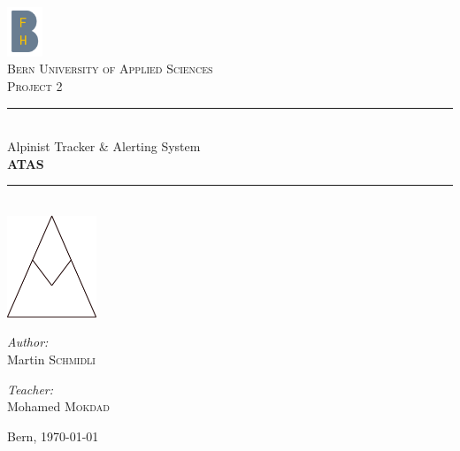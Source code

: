 \documentclass[a4paper,11pt, oneside]{report}
\theoremstyle{definition}
\begin{document}
\pagestyle{empty} %
\begin{titlepage}
\begin{center}

\includegraphics[width=0.08\textwidth]{img/bfh_logo.png}\\[1cm]    
\textsc{\LARGE Bern University of Applied Sciences}\\[1.5cm]
\textsc{\Large Project 2}\\[0.5cm]

\newcommand{\HRule}{\rule{\linewidth}{0.3mm}}
\HRule \\[0.4cm]
{\huge Alpinist Tracker \& Alerting System}\\[0.3cm]
{\huge \bfseries  ATAS}
\HRule \\[2cm]

\includegraphics[width=0.2\textwidth]{img/atas_logo.png}\\[3cm]    

\begin{minipage}{0.4\textwidth}
\begin{flushleft} \large
\emph{Author:}\\
Martin \textsc{Schmidli}\\
\end{flushleft}
\end{minipage}
\hfill
\begin{minipage}{0.4\textwidth}
\begin{flushright} \large
\emph{Teacher:} \\
Mohamed \textsc{Mokdad}
\end{flushright}
\end{minipage}
\vfill

Bern, {\large \today}
\end{center}
\end{titlepage}
\pagestyle{fancy}

\tableofcontents
\end{document}
